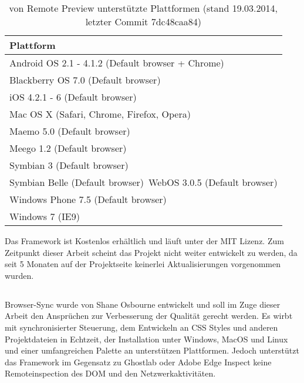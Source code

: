 	\begin{table}[H]
 		\centering
			\begin{tabular}{| p{13cm} |}
			
			\hline
				Plattform\\
			\hline
			\hline
				Android OS 2.1 - 4.1.2 (Default browser + Chrome)\\
				Blackberry OS 7.0 (Default browser)\\
				iOS 4.2.1 - 6 (Default browser)\\
				Mac OS X (Safari, Chrome, Firefox, Opera)\\
				Maemo 5.0 (Default browser)\\
				Meego 1.2 (Default browser)\\
				Symbian 3 (Default browser)\\
				Symbian Belle (Default browser)\
				WebOS 3.0.5 (Default browser)\\
				Windows Phone 7.5 (Default browser)\\	
				Windows 7 (IE9)\\
				\hline
				\end{tabular}
			\caption{von Remote Preview unterstützte Plattformen (stand 19.03.2014, letzter Commit 7dc48caa84)}
	\end{table}
	Das Framework ist Kostenlos erhältlich und läuft unter der MIT Lizenz. Zum Zeitpunkt dieser Arbeit scheint das Projekt nicht 		weiter entwickelt zu werden, da seit 5 Monaten auf der Projektseite keinerlei Aktualisierungen vorgenommen wurden.

		
	\subsection{}
	Browser-Sync wurde von Shane Osbourne entwickelt und soll im Zuge dieser Arbeit den Ansprüchen zur Verbesserung der Qualität gerecht werden. Es wirbt mit synchronisierter Steuerung, dem Entwickeln an CSS Styles und anderen Projektdateien in Echtzeit, der Installation unter Windows, MacOS und Linux und einer umfangreichen Palette an unterstützen Plattformen. Jedoch unterstützt das Framework im Gegensatz zu Ghostlab oder Adobe Edge Inspect keine Remoteinspection des DOM und den Netzwerkaktivitäten.
	
